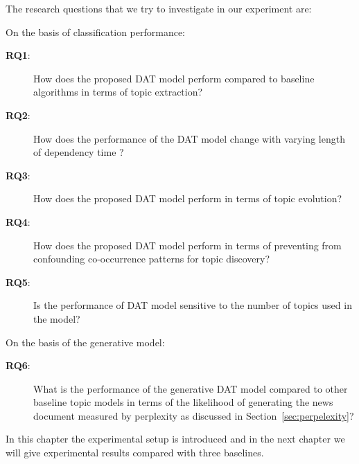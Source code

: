 The research questions that we try to investigate in our experiment are:
\begin{description}
	\item On the basis of classification performance:
	\begin{description}
	\item[\textbf{RQ1}:] How does the proposed DAT model perform compared to baseline algorithms in terms of topic extraction? %
	\item[\textbf{RQ2}:] How does the performance of the DAT model change with varying length of dependency time ?
	\item[\textbf{RQ3}:] How does the proposed DAT model perform in terms of topic evolution? %
	\item[\textbf{RQ4}:] How does the proposed DAT model perform in terms of preventing from confounding co-occurrence patterns for topic discovery? %
	\item[\textbf{RQ5}:] Is the performance of DAT model sensitive to the number of topics used in the model? %
	\end{description}
	\item On the basis of the generative model:
	\begin{description}
	\item[\textbf{RQ6}:] What is the performance of the generative DAT model compared to other baseline topic models in terms of the likelihood of generating the news document measured by perplexity as discussed in Section~\ref{sec:perpelexity}?
	\end{description}
\end{description}

In this chapter the experimental setup is introduced and in the next chapter we will give experimental results compared with three baselines.
